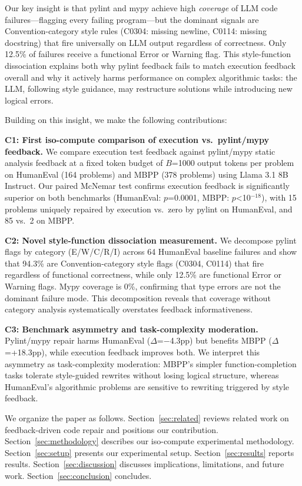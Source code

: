 Our key insight is that pylint and mypy achieve high \emph{coverage} of LLM code failures---flagging every failing program---but the dominant signals are Convention-category style rules (C0304: missing newline, C0114: missing docstring) that fire universally on LLM output regardless of correctness. Only 12.5\% of failures receive a functional Error or Warning flag. This style-function dissociation explains both why pylint feedback fails to match execution feedback overall and why it actively harms performance on complex algorithmic tasks: the LLM, following style guidance, may restructure solutions while introducing new logical errors.

Building on this insight, we make the following contributions:

\textbf{C1: First iso-compute comparison of execution vs.\ pylint/mypy feedback.} We compare execution test feedback against pylint/mypy static analysis feedback at a fixed token budget of $B$=1000 output tokens per problem on HumanEval (164 problems) and MBPP (378 problems) using Llama 3.1 8B Instruct. Our paired McNemar test confirms execution feedback is significantly superior on both benchmarks (HumanEval: $p$=0.0001, MBPP: $p$<10$^{-18}$), with 15 problems uniquely repaired by execution vs.\ zero by pylint on HumanEval, and 85 vs.\ 2 on MBPP.

\textbf{C2: Novel style-function dissociation measurement.} We decompose pylint flags by category (E/W/C/R/I) across 64 HumanEval baseline failures and show that 94.3\% are Convention-category style flags (C0304, C0114) that fire regardless of functional correctness, while only 12.5\% are functional Error or Warning flags. Mypy coverage is 0\%, confirming that type errors are not the dominant failure mode. This decomposition reveals that coverage without category analysis systematically overstates feedback informativeness.

\textbf{C3: Benchmark asymmetry and task-complexity moderation.} Pylint/mypy repair harms HumanEval ($\Delta$=$-$4.3pp) but benefits MBPP ($\Delta$=+18.3pp), while execution feedback improves both. We interpret this asymmetry as task-complexity moderation: MBPP's simpler function-completion tasks tolerate style-guided rewrites without losing logical structure, whereas HumanEval's algorithmic problems are sensitive to rewriting triggered by style feedback.

We organize the paper as follows. Section~\ref{sec:related} reviews related work on feedback-driven code repair and positions our contribution. Section~\ref{sec:methodology} describes our iso-compute experimental methodology. Section~\ref{sec:setup} presents our experimental setup. Section~\ref{sec:results} reports results. Section~\ref{sec:discussion} discusses implications, limitations, and future work. Section~\ref{sec:conclusion} concludes.
